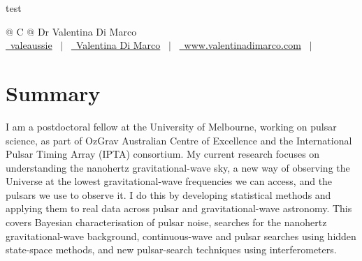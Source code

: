 \documentclass[a4paper,12pt]{article}
\begin{document}
test

\pagestyle{empty} 



\begin{tabularx}{\linewidth}{@{} C @{}}
\Huge{Dr Valentina Di Marco} \\[7.5pt]
\href{https://github.com/valeaussie}{\raisebox{-0.05\height}\faGithub\ valeaussie} \ $|$ \ 
\href{https://www.linkedin.com/in/valentina-di-marco/}{\raisebox{-0.05\height}\faLinkedin\ Valentina Di Marco} \ $|$ \ 
\href{https://www.valentinadimarco.com/}{\raisebox{-0.05\height}\faGlobe \ www.valentinadimarco.com} \ $|$ \\ 
\end{tabularx}


\section{Summary}
I am a postdoctoral fellow at the University of Melbourne, working on pulsar science, as part of OzGrav Australian Centre of Excellence and the International Pulsar Timing Array (IPTA) consortium.
My current research focuses on understanding the nanohertz gravitational-wave sky, a new way of observing the Universe at the lowest gravitational-wave frequencies we can access, and the pulsars we use to observe it. 
I do this by developing statistical methods and applying them to real data across pulsar and gravitational-wave astronomy.
This covers Bayesian characterisation of pulsar noise, searches for the nanohertz gravitational-wave background, continuous-wave and pulsar searches using hidden state-space methods, and new pulsar-search techniques using interferometers. 
\end{document}
